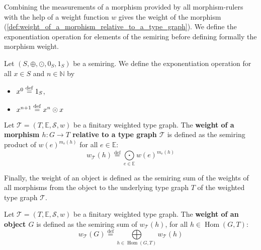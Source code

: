 Combining the measurements of a morphism provided by all morphism-rulers with the help of a weight function $w$ gives the weight of the morphism (\autoref{def:weight_of_a_morphism_relative_to_a_type_graph}).
 We define the exponentiation operation for elements of the semiring before defining formally the morphism weight.
\begin{notation} 
    \label{wfs:def:exponentiation}
Let $(S, \oplus, \odot, 0_S, 1_S)$ be a semiring. We define the exponentiation operation for all $x \in S$ and $n \in \mathbb{N}$ by
   \begin{itemize}
        \item $ x^0 \overset{\operatorname{def}}{=} 1_S$,
        \item $x^{n+1} \overset{\operatorname{def}}{=} x^n \odot x$
   \end{itemize}
\end{notation}
\begin{definition}
    \label{def:weight_of_a_morphism_relative_to_a_type_graph}
        Let $\mathcal{T}=(T,\mathbb{E},\mathcal{S},w)$ be a finitary weighted type graph.
         The \textbf{weight of a morphism $h: G \rightarrow T$ relative to a type graph $\mathcal{T}$} is defined as the semiring product of $w(e)^{m_e(h)}$ for all $e \in \mathbb{E}$:
        \[  w_{\mathcal{T}}(h) \overset{\operatorname{def}}{=} \underset{e \in \mathbb{E}}{\bigodot} 
                w(e)^{m_e(h)} \]
\end{definition}
Finally, the weight of an object is defined as the semiring sum of the weights of all morphisms from the object to the underlying type graph $T$ of the weighted type graph $\mathcal{T}$.
\begin{definition}
    \label{def:weight_of_an_object_relative_to_a_type_graph}
       Let $\mathcal{T}=(T,\mathbb{E},\mathcal{S},w)$ be a finitary weighted type graph. The \textbf{weight of an object \( G \)} is defined as the semiring sum of $w_\mathcal{T}(h)$, for all \( h \in \operatorname{Hom}(G,T) \):
        \[ w_\mathcal{T}(G) \overset{\operatorname{def}}{=} \underset{h \in \operatorname{Hom}(G,T)}{\bigoplus}  w_\mathcal{T}(h) \]
\end{definition}

